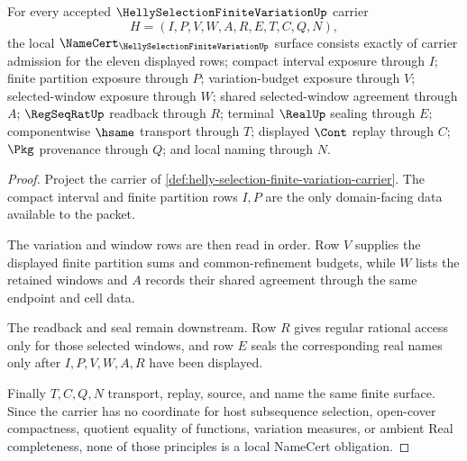 \begin{theorem}
\label{thm:helly-selection-finite-variation-namecert-obligations}
For every accepted $\HellySelectionFiniteVariationUp$ carrier
$$
H=(I,P,V,W,A,R,E,T,C,Q,N),
$$
the local $\NameCert_{\HellySelectionFiniteVariationUp}$ surface consists exactly of carrier admission for the eleven displayed rows; compact interval exposure through $I$; finite partition exposure through $P$; variation-budget exposure through $V$; selected-window exposure through $W$; shared selected-window agreement through $A$; $\RegSeqRatUp$ readback through $R$; terminal $\RealUp$ sealing through $E$; componentwise $\hsame$ transport through $T$; displayed $\Cont$ replay through $C$; $\Pkg$ provenance through $Q$; and local naming through $N$.
\end{theorem}
\begin{proof}
Project the carrier of \autoref{def:helly-selection-finite-variation-carrier}. The compact interval and finite partition rows $I,P$ are the only domain-facing data available to the packet.

The variation and window rows are then read in order. Row $V$ supplies the displayed finite partition sums and common-refinement budgets, while $W$ lists the retained windows and $A$ records their shared agreement through the same endpoint and cell data.

The readback and seal remain downstream. Row $R$ gives regular rational access only for those selected windows, and row $E$ seals the corresponding real names only after $I,P,V,W,A,R$ have been displayed.

Finally $T,C,Q,N$ transport, replay, source, and name the same finite surface. Since the carrier has no coordinate for host subsequence selection, open-cover compactness, quotient equality of functions, variation measures, or ambient Real completeness, none of those principles is a local NameCert obligation.
\end{proof}

